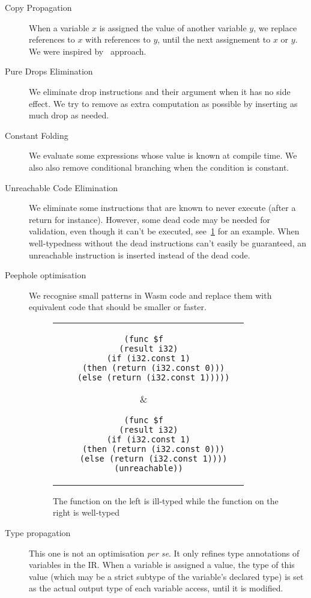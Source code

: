 \documentclass[10pt]{article}
\begin{document}
\begin{description}
  \item[Copy Propagation] When a variable $x$ is assigned the value of another
    variable $y$, we replace references to $x$ with references to $y$, until the
    next assignement to $x$ or $y$. We were inspired
    by~\cite[Section~12.5]{muchnick1997advanced} approach.
  \item[Pure Drops Elimination] We eliminate \textsf{drop} instructions and
    their argument when it has no side effect. We try to remove as extra
    computation as possible by inserting as much \textsf{drop} as needed.
  \item[Constant Folding] We evaluate some expressions whose value is known at
    compile time. We also also remove conditional branching when the condition
    is constant.
  \item[Unreachable Code Elimination] We eliminate some instructions that are
    known to never execute (after a \textsf{return} for instance). However, some
    dead code may be needed for validation, even though it can't be executed,
    see~\ref{unreachable} for an example. When well-typedness without the dead
    instructions can't easily be guaranteed, an \textsf{unreachable} instruction
    is inserted instead of the dead code.
  \item[Peephole optimisation] We recognise small patterns in Wasm code and
    replace them with equivalent code that should be smaller or faster.
\begin{figure}[h]
\centering
\begin{tabular}{c c}
\begin{minipage}{2.8in}
\begin{verbatim}
(func $f
  (result i32)
  (if (i32.const 1)
    (then (return (i32.const 0)))
    (else (return (i32.const 1)))))
\end{verbatim}
\end{minipage}
&\begin{minipage}{2.8in}
\begin{verbatim}
(func $f
  (result i32)
  (if (i32.const 1)
    (then (return (i32.const 0)))
    (else (return (i32.const 1))))
  (unreachable))
\end{verbatim}
\end{minipage}
\end{tabular}
\caption{The function on the left is ill-typed while the function on the right
  is well-typed}\label{unreachable}
\end{figure}
  \item[Type propagation] This one is not an optimisation \emph{per se}. It only
    refines type annotations of variables in the IR. When a variable is assigned
    a value, the type of this value (which may be a strict subtype of the
    variable's declared type) is set as the actual output type of each variable
    access, until it is modified.
\end{description}
\end{document}
